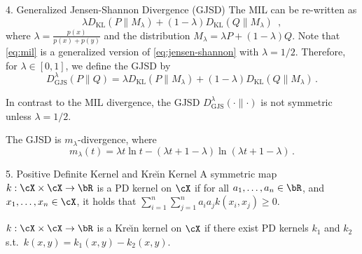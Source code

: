 \documentclass[final]{beamer}
\newcommand{\kr}{Kre\u{\i}n\xspace}
\newcommand{\kl}[2]{D_{\mathrm{KL}}( #1 \parallel #2 )}
\newcommand{\js}[2]{D_{\mathrm{JS}}( #1 \parallel #2 )}
\newcommand{\wjs}[3]{D_{\mathrm{GJS}}^{#1}( #2 \parallel #3 )}
\newlength{\onecolwid}
\begin{document}
\begin{frame}[t]
\begin{columns}[t]
\begin{column}{\onecolwid}
\begin{block}{4. Generalized Jensen-Shannon Divergence (GJSD)}
	The MIL can be 
	re-written as
	\begin{equation}\label{eq:mil}
	\lambda \kl{P}{M_\lambda} + (1-\lambda) \kl{Q}{M_\lambda}\enspace,
	\end{equation}
	where  $\lambda=\frac{p(x)}{p(x)+p(y)}$ and the distribution $ 
	M_\lambda=\lambda P + (1-\lambda)Q $.
	Note that \eqref{eq:mil} is a generalized version of 
	\eqref{eq:jensen-shannon} with $ \lambda=1/2 $. 
	Therefore, for $ \lambda\in [0,1] $, we define the 
	GJSD
	by
	\[
	\wjs{\lambda}{P}{Q} = \lambda \kl{P}{M_\lambda} + (1-\lambda) 
	\kl{Q}{M_\lambda}\,.\]

	
	 In 
	contrast to the MIL 
	divergence, the GJSD $ \wjs{\lambda}{\cdot}{\cdot} $ is not symmetric 
	unless 
	$ \lambda=1/2 $.

 The GJSD is  $ m_\lambda $-divergence, where \[	
m_\lambda(t) = \lambda t \ln t - (\lambda t + 1 - 
\lambda)\ln(\lambda t+1-\lambda)\,.\]
\end{block}	

\begin{block}{5. Positive Definite Kernel and \kr Kernel}
		 A symmetric
		  map $ 
		k:\cX\times\cX\to \bR $ is a PD kernel on $ \cX $ if for 
		all 
		  $ a_1,\dots,a_n\in \bR $, and $ 
		x_1,\dots,x_n\in \cX $, it holds that $
		\sum_{i=1}^n \sum_{j=1}^n a_i a_j k(x_i,x_j) \ge 0$.
	
	
	\structure{\textbf{\kr kernel.
	}}
		 $ 
		k:\cX\times\cX\to \bR $ is a \kr kernel on $ \cX $ if there exist 
		PD kernels $ k_1 $ and $ k_2 $ s.t.\ $ 
		k(x,y)=k_1(x,y)-k_2(x,y) $.


\end{block}
\end{column}
\end{columns}
\end{frame}
\end{document}
